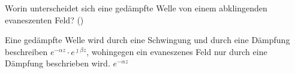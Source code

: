 \begin{question}[section=2,name={Gedämpfte Welle},difficulty=,quantity=,type=thr,tags={20160310,20131024,20130724}]
	Worin unterscheidet sich eine gedämpfte Welle von einem abklingenden evaneszenten Feld? ()
	
\end{question}
\begin{solution}
	Eine gedämpfte Welle wird durch eine Schwingung und durch eine Dämpfung beschreiben $e^{-\alpha z}\cdot e^{\jmath \beta z}$, wohingegen ein evaneszenes Feld nur durch eine Dämpfung beschrieben wird. $e^{-\alpha z}$
\end{solution}
